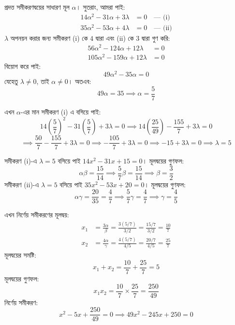 \documentclass[12pt, a4paper]{article}
\begin{document}
\begin{tcolorbox}[solutionbox={সমাধান (Solution)}]
    \noindent
    প্রদত্ত সমীকরণদ্বয়ের সাধারণ মূল $\alpha$। সুতরাং, আমরা পাই:
    \begin{align*}
        14\alpha^2 - 31\alpha + 3\lambda &= 0 \quad \text{--- (i)} \\
        35\alpha^2 - 53\alpha + 4\lambda &= 0 \quad \text{--- (ii)}
    \end{align*}
    $\lambda$ অপনয়ন করার জন্য সমীকরণ (i) কে $4$ দ্বারা এবং (ii) কে $3$ দ্বারা গুণ করি:
    \begin{align*}
        56\alpha^2 - 124\alpha + 12\lambda &= 0 \\
        105\alpha^2 - 159\alpha + 12\lambda &= 0
    \end{align*}
    বিয়োগ করে পাই:
    \[ 49\alpha^2 - 35\alpha = 0 \]
    যেহেতু $\lambda \ne 0$, তাই $\alpha \ne 0$। অতএব:
    \[ 49\alpha = 35 \implies \alpha = \frac{5}{7} \]
    
    \vspace{0.5em}
    এখন $\alpha$-এর মান সমীকরণ (i) এ বসিয়ে পাই:
    \[ 14\left(\frac{5}{7}\right)^2 - 31\left(\frac{5}{7}\right) + 3\lambda = 0 \implies 14\left(\frac{25}{49}\right) - \frac{155}{7} + 3\lambda = 0 \]
    \[ \implies \frac{50}{7} - \frac{155}{7} + 3\lambda = 0 \implies -\frac{105}{7} + 3\lambda = 0 \implies -15 + 3\lambda = 0 \implies \lambda = 5 \]
    
    \vspace{0.5em}
    সমীকরণ (i)-এ $\lambda = 5$ বসিয়ে পাই $14x^2 - 31x + 15 = 0$। মূলদ্বয়ের গুণফল:
    \[ \alpha\beta = \frac{15}{14} \implies \frac{5}{7}\beta = \frac{15}{14} \implies \beta = \frac{3}{2} \]
    সমীকরণ (ii)-এ $\lambda = 5$ বসিয়ে পাই $35x^2 - 53x + 20 = 0$। মূলদ্বয়ের গুণফল:
    \[ \alpha\gamma = \frac{20}{35} = \frac{4}{7} \implies \frac{5}{7}\gamma = \frac{4}{7} \implies \gamma = \frac{4}{5} \]
    
    \vspace{0.5em}
    এখন নির্ণেয় সমীকরণের মূলদ্বয়:
    \begin{align*}
        x_1 &= \frac{3\alpha}{\beta} = \frac{3(5/7)}{3/2} = \frac{15/7}{3/2} = \frac{10}{7} \\
        x_2 &= \frac{4\alpha}{\gamma} = \frac{4(5/7)}{4/5} = \frac{20/7}{4/5} = \frac{25}{7}
    \end{align*}
    মূলদ্বয়ের সমষ্টি: 
    \[ x_1 + x_2 = \frac{10}{7} + \frac{25}{7} = 5 \]
    মূলদ্বয়ের গুণফল: 
    \[ x_1 x_2 = \frac{10}{7} \times \frac{25}{7} = \frac{250}{49} \]
    নির্ণেয় সমীকরণ: 
    \[ x^2 - 5x + \frac{250}{49} = 0 \implies 49x^2 - 245x + 250 = 0 \]
\end{tcolorbox}
\end{document}
